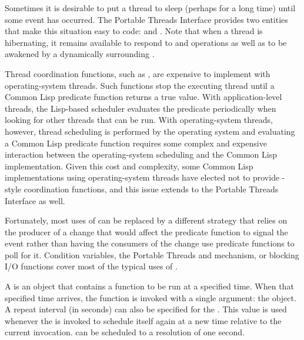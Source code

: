 \documentclass[10pt,twoside,english,pdftex]{article}
\begin{document}

Sometimes it is desirable to put a thread to sleep (perhaps for a long time)
until some event has occurred.  The Portable Threads Interface provides two
entities that make this situation easy to code:
\textbf{} and \textbf{}.
Note that when a thread is hibernating, it remains available to respond to
\textbf{} and \textbf{}
operations as well as to be awakened by a dynamically surrounding
\textbf{}.


Thread coordination functions, such as , are expensive to
implement with operating-system threads.  Such functions stop the executing
thread until a Common Lisp predicate function returns a true value.  With
application-level threads, the Lisp-based scheduler evaluates the predicate
periodically when looking for other threads that can be run.  With
operating-system threads, however, thread scheduling is performed by the
operating system and evaluating a Common Lisp predicate function requires some
complex and expensive interaction between the operating-system scheduling and
the Common Lisp implementation.  Given this cost and complexity, some Common
Lisp implementations using operating-system threads have elected not to
provide -style coordination functions, and this issue
extends to the Portable Threads Interface as well.

Fortunately, most uses of  can be replaced by a different
strategy that relies on the producer of a change that would affect the
 predicate function to signal the event rather than having
the consumers of the change use predicate functions to poll for it.  Condition
variables, the Portable Threads \textbf{} and
\textbf{} mechanism, or blocking I/O functions cover
most of the typical uses of .


A  is an object that contains a function to be run
at a specified time. When that specified time arrives, the function is invoked
with a single argument: the  object. A repeat
interval (in seconds) can also be specified for the
. This value is used whenever the
 is invoked to schedule itself again at a new time
relative to the current invocation.   can be
scheduled to a resolution of one second.  
\end{document}
